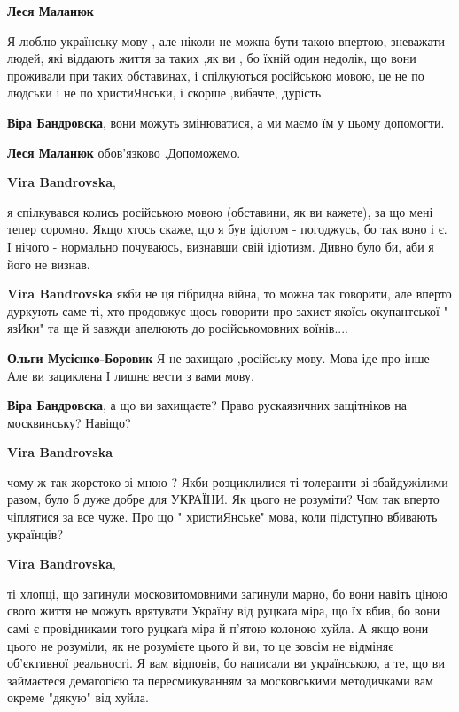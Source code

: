 \begin{itemize}
\begin{itemize}
\textbf{Леся Маланюк} 

Я люблю українську мову , але ніколи не можна бути такою впертою, зневажати
людей, які віддають життя за таких ,як ви , бо їхній один недолік, що вони
проживали при таких обставинах, і спілкуються російською мовою, це не по людськи
і не по христиЯнськи, і скорше ,вибачте, дурість

\textbf{Віра Бандровска}, вони можуть змінюватися, а ми маємо їм у цьому допомогти.

\textbf{Леся Маланюк} обов'язково .Допоможемо.

\textbf{Vira Bandrovska}, 

я спілкувався колись російською мовою (обставини, як ви кажете), за що мені
тепер соромно. Якщо хтось скаже, що я був ідіотом - погоджусь, бо так воно і є.
І нічого - нормально почуваюсь, визнавши свій ідіотизм. Дивно було би, аби я
його не визнав.

\textbf{Vira Bandrovska} якби не ця гібридна війна, то можна так говорити, але вперто дуркують саме ті, хто продовжує щось говорити про захист якоїсь окупантської " язИки" та ще й завжди апелюють до російськомовних воїнів....

\textbf{Ольги Мусієнко-Боровик} Я не захищаю ,російську мову. Мова іде про інше Але ви зациклена І лишнє вести з вами мову.

\textbf{Віра Бандровска}, а що ви захищаєте? Право рускаязичних защітніков на москвинську? Навіщо?

\textbf{Vira Bandrovska} 

чому ж так жорстоко зі мною ? Якби розциклилися ті толеранти зі збайдужілими
разом, було б дуже добре для УКРАЇНИ. Як цього не розуміти? Чом так вперто
чіплятися за все чуже. Про що " христиЯнське" мова, коли підступно вбивають
українців?

\textbf{Vira Bandrovska}, 

ті хлопці, що загинули московитомовними загинули марно, бо вони навіть ціною
свого життя не можуть врятувати Україну від руцкаґа міра, що їх вбив, бо вони
самі є провідниками того руцкаґа міра й п'ятою колоною хуйла. А якщо вони цього
не розуміли, як не розумієте цього й ви, то це зовсім не відміняє об'єктивної
реальності. Я вам відповів, бо написали ви українською, а те, що ви займаєтеся
демагогією та пересмикуванням за московськими методичками вам окреме "дякую"
від хуйла.


\end{itemize}
\end{itemize}
